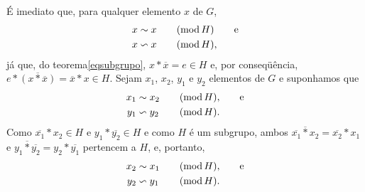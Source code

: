 \begin{dem}
  É imediato que, para
  qualquer elemento $x$ de $G$,
  \begin{equation*}
    \begin{aligned}
      \congmodrighta{x}{x}{H}\qquad\text{e}\\
      \congmodlefta{x}{x}{H}\MMv
    \end{aligned}
  \end{equation*}
  já que, do teorema\xspace\ref{eqsubgrupo},
  $x\ast\overline{x}=e\in H$ e, por conseqüência,
  $e\ast\overline{(x\ast\overline{x})}=\overline{x}\ast x\in H$.
  Sejam $x_1$, $x_2$, $y_1$ e $y_2$
  elementos de $G$ e suponhamos que
  \begin{equation*}
    \begin{aligned}
      \congmodrighta{x_1}{x_2}{H}\MMv\qquad\text{e}\\
      \congmodlefta{y_1}{y_2}{H}\MMp
    \end{aligned}
  \end{equation*}
  Como $\overline{x_1}\ast x_2\in H$ e $y_1\ast\overline{y_2}\in H$
  e como $H$ é
  um subgrupo, ambos $\overline{\overline{x_1}\ast x_2}=
  \overline{x_2}\ast x_1$
  e $\overline{y_1\ast\overline{y_2}}=
  y_2\ast\overline{y_1}$ pertencem a $H$, e, portanto,
  \begin{equation*}
    \begin{aligned}
      \congmodrighta{x_2}{x_1}{H}\MMv\qquad\text{e}\\
      \congmodlefta{y_2}{y_1}{H}\MMp
    \end{aligned}
  \end{equation*}


\end{dem}
